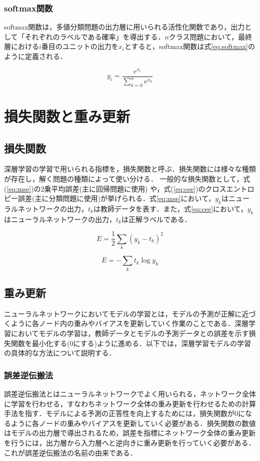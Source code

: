 \documentclass[a4j, 11pt]{jreport}
\begin{document}
\subsubsection{softmax関数}
softmax関数は，多値分類問題の出力層に用いられる活性化関数であり，出力として「それぞれのラベルである確率」を導出する．$n$クラス問題において，最終層における$i$番目のユニットの出力を$x_{i}$とすると，softmax関数は式\ref{eq:softmax}のように定義される．

\begin{equation}
 y_{i} = \frac{e^{x_{i}}}{\sum_{k=0}^{n}e^{x_{k}}}
 \label{eq:softmax}
\end{equation}

\section{損失関数と重み更新}
\subsection{損失関数}
深層学習の学習で用いられる指標を，損失関数と呼ぶ．損失関数には様々な種類が存在し，解く問題の種類によって使い分ける．
一般的な損失関数として，式(\ref{eq:mse})の2乗平均誤差(主に回帰問題に使用) や，式(\ref{eq:cee})のクロスエントロピー誤差(主に分類問題に使用)が挙げられる．式\ref{eq:mse}において，$y_{k}$はニューラルネットワークの出力，$t_{k}$は教師データを表す．また，式\ref{eq:cee}において，$y_{k}$はニューラルネットワークの出力，$t_{k}$は正解ラベルである．

\begin{equation}
	E = \frac{1}{2} \sum_{k} ({y_k} - t_k)^2
	\label{eq:mse}
\end{equation}

\begin{equation}
	E = -\sum_{k}t_{k}\log y_{k}
	\label{eq:cee}
\end{equation}

\subsection{重み更新}
ニューラルネットワークにおいてモデルの学習とは，モデルの予測が正解に近づくように各ノード内の重みやバイアスを更新していく作業のことである．深層学習においてモデルの学習は，教師データとモデルの予測データとの誤差を示す損失関数を最小化する(0にする)ように進める．以下では，深層学習モデルの学習の具体的な方法について説明する．
\subsubsection{誤差逆伝搬法}
誤差逆伝搬法とはニューラルネットワークでよく用いられる，ネットワーク全体に学習を行わせる，すなわちネットワーク全体の重み更新を行わせるための計算手法を指す．モデルによる予測の正答性を向上するためには，損失関数が0になるように各ノードの重みやバイアスを更新していく必要がある．損失関数の数値はモデルの出力層で導出されるため，誤差を指標にネットワーク全体の重み更新を行うには，出力層から入力層へと逆向きに重み更新を行っていく必要がある．これが誤差逆伝搬法の名前の由来である．
\end{document}
